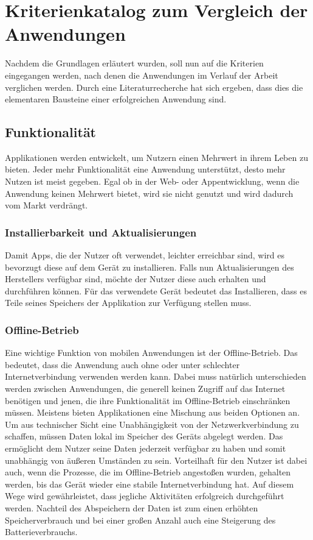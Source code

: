 \chapter{Kriterienkatalog zum Vergleich der Anwendungen}\label{ch:catalog}
Nachdem die Grundlagen erläutert wurden, soll nun auf die Kriterien eingegangen werden, nach denen die Anwendungen im Verlauf der Arbeit verglichen werden. Durch eine Literaturrecherche hat sich ergeben, dass dies die elementaren Bausteine einer erfolgreichen Anwendung sind. 

\section{Funktionalität}
Applikationen werden entwickelt, um Nutzern einen Mehrwert in ihrem Leben zu bieten. Jeder mehr Funktionalität eine Anwendung unterstützt, desto mehr Nutzen ist meist gegeben. Egal ob in der Web- oder Appentwicklung, wenn die Anwendung keinen Mehrwert bietet, wird sie nicht genutzt und wird dadurch vom Markt verdrängt.

\subsection{Installierbarkeit und Aktualisierungen}
Damit Apps, die der Nutzer oft verwendet, leichter erreichbar sind, wird es bevorzugt diese auf dem Gerät zu installieren. Falls nun Aktualisierungen des Herstellers verfügbar sind, möchte der Nutzer diese auch erhalten und durchführen können. Für das verwendete Gerät bedeutet das Installieren, dass es Teile seines Speichers der Applikation zur Verfügung stellen muss. 

\subsection{Offline-Betrieb}
Eine wichtige Funktion von mobilen Anwendungen ist der Offline-Betrieb. Das bedeutet, dass die Anwendung auch ohne oder unter schlechter Internetverbindung verwenden werden kann. Dabei muss natürlich unterschieden werden zwischen Anwendungen, die generell keinen Zugriff auf das Internet benötigen und jenen, die ihre Funktionalität im Offline-Betrieb einschränken müssen. Meistens bieten Applikationen eine Mischung aus beiden Optionen an. Um aus technischer Sicht eine Unabhängigkeit von der Netzwerkverbindung zu schaffen, müssen Daten lokal im Speicher des Geräts abgelegt werden. Das ermöglicht dem Nutzer seine Daten jederzeit verfügbar zu haben und somit unabhängig von äußeren Umständen zu sein. Vorteilhaft für den Nutzer ist dabei auch, wenn die Prozesse, die im Offline-Betrieb angestoßen wurden, gehalten werden, bis das Gerät wieder eine stabile Internetverbindung hat. Auf diesem Wege wird gewährleistet, dass jegliche Aktivitäten erfolgreich durchgeführt werden. Nachteil des Abspeichern der Daten ist zum einen erhöhten Speicherverbrauch und bei einer großen Anzahl auch eine Steigerung des Batterieverbrauchs.

